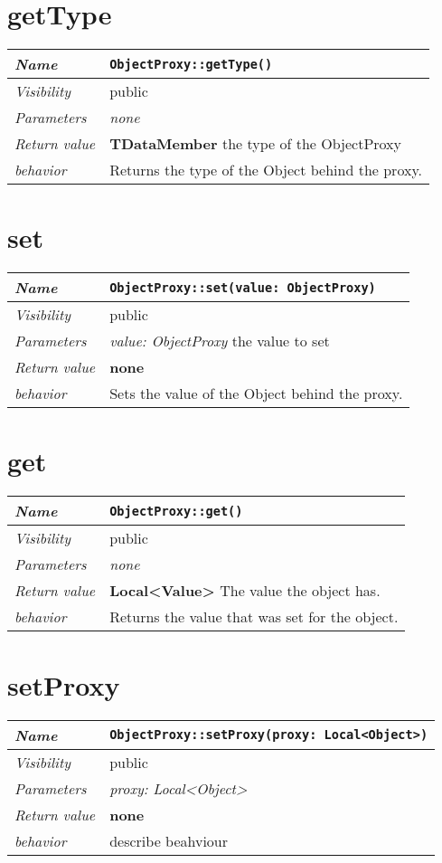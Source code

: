  \section{getType}
\begin{longtable}{p{3cm} @{\hskip 1cm} p{12cm}}
 \hline
\textit{Name} & \texttt{ObjectProxy::getType()}\\
\hline
 \textit{Visibility} & public\\
\hline
\textit{Parameters} & \textit{none}\\
\hline
\textit{Return value} & \textbf{TDataMember} the type of the ObjectProxy\\
  \hline
 \textit{behavior} & Returns the type of the Object behind the proxy.\\
\hline
\end{longtable} \pagebreak
 \section{set}
\begin{longtable}{p{3cm} @{\hskip 1cm} p{12cm}}
 \hline
\textit{Name} & \texttt{ObjectProxy::set(value: ObjectProxy)}\\
\hline
 \textit{Visibility} & public\\
\hline
\textit{Parameters} & \textit{value: ObjectProxy} the value to set\\
\hline
\textit{Return value} & \textbf{none}\\
  \hline
 \textit{behavior} & Sets the value of the Object behind the proxy.\\
\hline
\end{longtable} \pagebreak
 \section{get}
\begin{longtable}{p{3cm} @{\hskip 1cm} p{12cm}}
 \hline
\textit{Name} & \texttt{ObjectProxy::get()}\\
\hline
 \textit{Visibility} & public\\
\hline
\textit{Parameters} & \textit{none}\\
\hline
\textit{Return value} & \textbf{Local<Value>} The value the object has.\\
  \hline
 \textit{behavior} & Returns the value that was set for the object.\\
\hline
\end{longtable} \pagebreak
 \section{setProxy}
\begin{longtable}{p{3cm} @{\hskip 1cm} p{12cm}}
 \hline
\textit{Name} & \texttt{ObjectProxy::setProxy(proxy: Local<Object>)}\\
\hline
 \textit{Visibility} & public\\
\hline
\textit{Parameters} & \textit{proxy: Local<Object>}\\
\hline
\textit{Return value} & \textbf{none}\\
  \hline
 \textit{behavior} & describe beahviour \\
\hline
\end{longtable} \pagebreak
